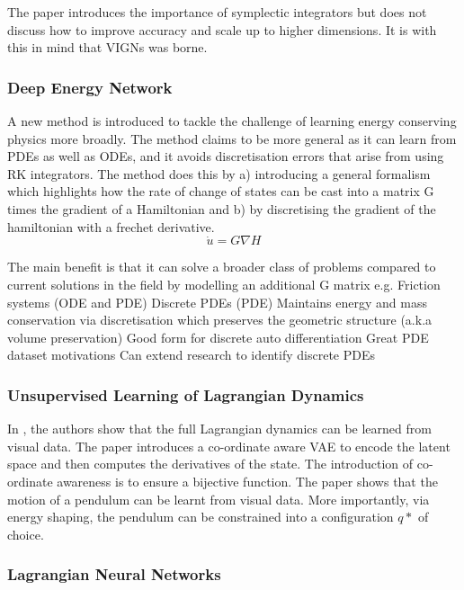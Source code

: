 \documentclass{article}
\begin{document}
The paper introduces the importance of symplectic integrators but does not discuss how to improve accuracy and scale up to higher dimensions. It is with this in mind that VIGNs was borne.


\subsubsection{Deep Energy Network}

A new method is introduced to tackle the challenge of learning energy conserving physics more broadly. The method claims to be more general as it can learn from PDEs as well as ODEs, and it avoids discretisation errors that arise from using RK integrators. The method does this by a) introducing a general formalism which highlights how the rate of change of states can be cast into a matrix G times the gradient of a Hamiltonian and b) by discretising the gradient of the hamiltonian with a frechet derivative. 
\begin{equation}
 \dot{u} = G\nabla H
\end{equation}
 
The main benefit is that it can solve a broader class of problems compared to current solutions in the field by modelling an additional G matrix e.g.
Friction systems (ODE and PDE)
Discrete PDEs (PDE)
Maintains energy and mass conservation via discretisation which preserves the geometric structure (a.k.a volume preservation)
Good form for discrete auto differentiation
Great PDE dataset motivations
Can extend research to identify discrete PDEs

\subsubsection{Unsupervised Learning of Lagrangian Dynamics}

In \cite{zhong_unsupervised_2020}, the authors show that the full Lagrangian dynamics can be learned from visual data. The paper introduces a co-ordinate aware VAE to encode the latent space and then computes the derivatives of the state. The introduction of co-ordinate awareness is to ensure a bijective function. The paper shows that the motion of a pendulum can be learnt from visual data. More importantly, via energy shaping, the pendulum can be constrained into a configuration $q*$ of choice.

\subsubsection{Lagrangian Neural Networks}
\end{document}
